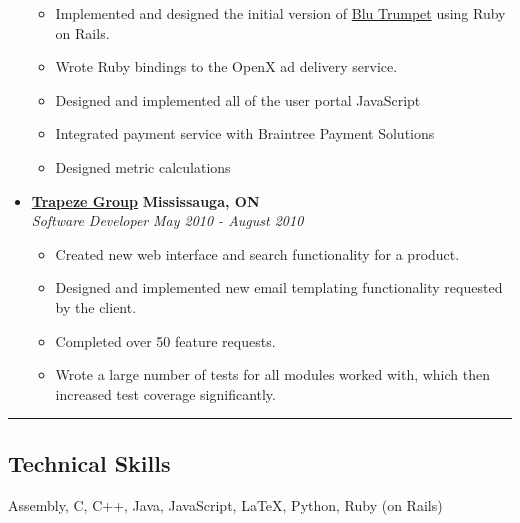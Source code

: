 \documentclass[10pt,letterpaper]{article}
\begin{document}
\begin{itemize}
    \begin{itemize}[label=\textbullet]
      \itemsep0em
      \item Implemented and designed the initial version of
            \href{http://www.blutrumpet.com/}{Blu Trumpet} using Ruby on Rails.
      \item Wrote Ruby bindings to the OpenX ad delivery service.
      \item Designed and implemented all of the user portal JavaScript
      \item Integrated payment service with Braintree Payment Solutions
      \item Designed metric calculations
    \end{itemize}

    \item[]
    {\href{http://www.trapezegroup.com/}{\textbf{Trapeze Group}} \hfill
      \textbf{Mississauga, ON}}
    \\
    {\emph{Software Developer} \hfill \emph{May 2010 - August 2010}}

    \begin{itemize}[label=\textbullet]
      \itemsep0em
      \item Created new web interface and search functionality for a product.
      \item Designed and implemented new email templating functionality
            requested by the client.
      \item Completed over 50 feature requests.
      \item Wrote a large number of tests for all modules worked with, which
            then increased test coverage significantly.
    \end{itemize}
  \end{itemize}


\hrule
\vspace{-0.4em}
\subsection*{Technical Skills}
\begin{description}[labelindent=\parindent]
  \item[Languages:]
  Assembly, C, C++, Java, JavaScript, \LaTeX, Python, Ruby (on Rails)
\end{description}

\end{document}
